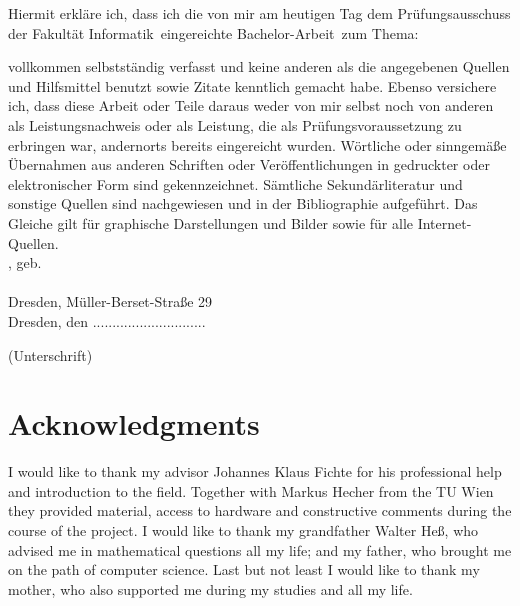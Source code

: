 \documentclass[a4paper, 12pt, bibliography=totoc]{scrartcl}
\begin{document}
\noindent
 Hiermit erkl\"{a}re ich, dass ich die von mir am heutigen Tag dem Pr\"{u}fungsausschuss der Fakult\"{a}t Informatik~eingereichte Bachelor-Arbeit~zum Thema:
\begin{center}
	\textit{\mytitle}
\end{center}

vollkommen selbstst\"{a}ndig verfasst und keine anderen als die angegebenen Quellen und Hilfsmittel benutzt sowie Zitate kenntlich gemacht habe. Ebenso versichere ich, dass diese Arbeit
oder Teile daraus weder von mir selbst noch von anderen als Leistungsnachweis oder als Leistung, die als Prüfungsvoraussetzung
zu erbringen war, andernorts bereits eingereicht wurden. Wörtliche oder sinngemäße Übernahmen aus anderen Schriften
oder Veröffentlichungen in gedruckter oder elektronischer Form sind gekennzeichnet.
Sämtliche Sekundärliteratur und sonstige Quellen sind nachgewiesen und in der Bibliographie aufgeführt.
Das Gleiche gilt für graphische Darstellungen und Bilder sowie für alle Internet-Quellen. \\[20pt]

\noindent
\myauthor, geb. \mybirthday \\\\
 Dresden, Müller-Berset-Straße 29\\[80pt]


Dresden,  den \myabgabe \hfill .............................
\begin{flushright}
	(Unterschrift)\hspace{1em}
\end{flushright}


\newpage
\newpage
\section*{Acknowledgments}
\vspace{5ex}
I would like to thank my advisor Johannes Klaus Fichte for his professional help and introduction to the field. Together with Markus Hecher from the TU Wien they provided material, access to hardware and constructive comments during the course of the project.
 I would like to thank my grandfather Walter Heß, who advised me in mathematical questions all my life; and my father, who brought me on the path of computer science. Last but not least I would like to thank my mother, who also supported me during my studies and all my life. 
 \newpage
\newpage
\end{document}
